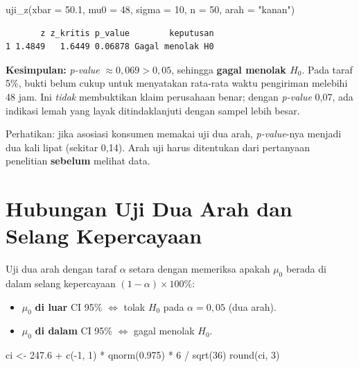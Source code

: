 \documentclass[
  indonesian,
  letterpaper,
]{book}
\newenvironment{Shaded}{\begin{snugshade}}{\end{snugshade}}
\newcommand{\AttributeTok}[1]{\textcolor[rgb]{0.40,0.45,0.13}{#1}}
\newcommand{\DecValTok}[1]{\textcolor[rgb]{0.68,0.00,0.00}{#1}}
\newcommand{\FloatTok}[1]{\textcolor[rgb]{0.68,0.00,0.00}{#1}}
\newcommand{\FunctionTok}[1]{\textcolor[rgb]{0.28,0.35,0.67}{#1}}
\newcommand{\NormalTok}[1]{\textcolor[rgb]{0.00,0.23,0.31}{#1}}
\newcommand{\OtherTok}[1]{\textcolor[rgb]{0.00,0.23,0.31}{#1}}
\newcommand{\SpecialCharTok}[1]{\textcolor[rgb]{0.37,0.37,0.37}{#1}}
\newcommand{\StringTok}[1]{\textcolor[rgb]{0.13,0.47,0.30}{#1}}
\providecommand{\tightlist}{%
  \setlength{\itemsep}{0pt}\setlength{\parskip}{0pt}}
\begin{document}
\begin{Shaded}
\begin{Highlighting}[]
\FunctionTok{uji\_z}\NormalTok{(}\AttributeTok{xbar =} \FloatTok{50.1}\NormalTok{, }\AttributeTok{mu0 =} \DecValTok{48}\NormalTok{, }\AttributeTok{sigma =} \DecValTok{10}\NormalTok{, }\AttributeTok{n =} \DecValTok{50}\NormalTok{, }\AttributeTok{arah =} \StringTok{"kanan"}\NormalTok{)}
\end{Highlighting}
\end{Shaded}

\begin{verbatim}
       z z_kritis p_value        keputusan
1 1.4849   1.6449 0.06878 Gagal menolak H0
\end{verbatim}

\textbf{Kesimpulan:} \emph{p-value} \(\approx 0{,}069 > 0{,}05\),
sehingga \textbf{gagal menolak \(H_0\)}. Pada taraf 5\%, bukti belum
cukup untuk menyatakan rata-rata waktu pengiriman melebihi 48 jam. Ini
\emph{tidak} membuktikan klaim perusahaan benar; dengan \emph{p-value}
0,07, ada indikasi lemah yang layak ditindaklanjuti dengan sampel lebih
besar.

Perhatikan: jika asosiasi konsumen memakai uji dua arah,
\emph{p-value}-nya menjadi dua kali lipat (sekitar 0,14). Arah uji harus
ditentukan dari pertanyaan penelitian \textbf{sebelum} melihat data.


\chapter{Hubungan Uji Dua Arah dan Selang
Kepercayaan}\label{hubungan-uji-dua-arah-dan-selang-kepercayaan}

Uji dua arah dengan taraf \(\alpha\) setara dengan memeriksa apakah
\(\mu_0\) berada di dalam selang kepercayaan
\((1-\alpha) \times 100\%\):

\begin{itemize}
\tightlist
\item
  \(\mu_0\) \textbf{di luar} CI 95\% \(\iff\) tolak \(H_0\) pada
  \(\alpha = 0{,}05\) (dua arah).
\item
  \(\mu_0\) \textbf{di dalam} CI 95\% \(\iff\) gagal menolak \(H_0\).
\end{itemize}

\begin{Shaded}
\begin{Highlighting}[]
\NormalTok{ci }\OtherTok{\textless{}{-}} \FloatTok{247.6} \SpecialCharTok{+} \FunctionTok{c}\NormalTok{(}\SpecialCharTok{{-}}\DecValTok{1}\NormalTok{, }\DecValTok{1}\NormalTok{) }\SpecialCharTok{*} \FunctionTok{qnorm}\NormalTok{(}\FloatTok{0.975}\NormalTok{) }\SpecialCharTok{*} \DecValTok{6} \SpecialCharTok{/} \FunctionTok{sqrt}\NormalTok{(}\DecValTok{36}\NormalTok{)}
\FunctionTok{round}\NormalTok{(ci, }\DecValTok{3}\NormalTok{)}
\end{Highlighting}
\end{Shaded}
\end{document}
